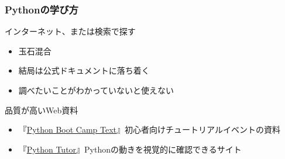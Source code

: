 \documentclass[aspectratio=169,dvipdfmx,12pt,notheorems]{beamer}
\theoremstyle{definition}
\begin{document}
%
%
%

\begin{frame}\frametitle{Pythonの学び方}

\begin{block}{インターネット、または検索で探す}
\begin{itemize}
\item 玉石混合
\item 結局は公式ドキュメントに落ち着く
\item 調べたいことがわかっていないと使えない
\end{itemize}
\end{block}

\begin{exampleblock}{品質が高いWeb資料}
\begin{itemize}
\item 『\href{https://pycamp.pycon.jp/textbook/index.html}{Python Boot Camp Text}』初心者向けチュートリアルイベントの資料
\item 『\href{https://pythontutor.com/}{Python Tutor}』Pythonの動きを視覚的に確認できるサイト
\end{itemize}
\end{exampleblock}

\end{frame}
\end{document}
